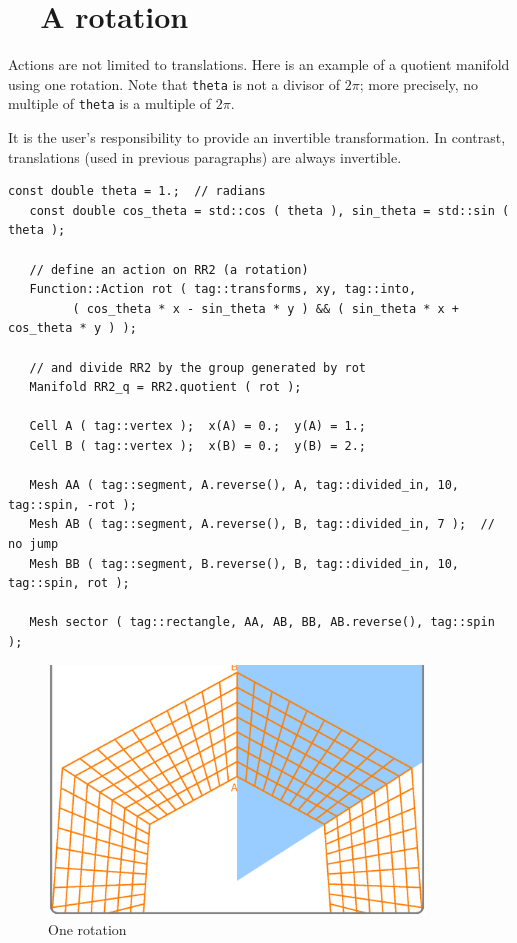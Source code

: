 \section{~~A rotation}\label{\numb section 7.\numb parag 11}

Actions are not limited to translations.
Here is an example of a quotient manifold using one rotation.
Note that {\small\tt theta} is not a divisor of $ 2\pi $;
more precisely, no multiple of {\small\tt theta} is a multiple of $ 2\pi $.

It is the user's responsibility to provide an invertible transformation.
In contrast, translations (used in previous paragraphs) are always invertible.

\begin{Verbatim}[commandchars=\\\{\},formatcom=\small\tt,frame=single,
   label=parag-\ref{\numb section 7.\numb parag 11}.cpp,rulecolor=\color{coment},
   baselinestretch=0.94,framesep=2mm                                             ]
   const double theta = 1.;  // radians
   const double cos_theta = std::cos ( theta ), sin_theta = std::sin ( theta );
	
   // define an action on RR2 (a rotation)
   Function::Action rot ( tag::transforms, xy, tag::into,
         ( cos_theta * x - sin_theta * y ) && ( sin_theta * x + cos_theta * y ) );

   // and divide RR2 by the group generated by rot
   Manifold RR2_q = RR2.quotient ( rot );

   Cell A ( tag::vertex );  x(A) = 0.;  y(A) = 1.;
   Cell B ( tag::vertex );  x(B) = 0.;  y(B) = 2.;

   Mesh AA ( tag::segment, A.reverse(), A, tag::divided_in, 10, tag::spin, -rot );
   Mesh AB ( tag::segment, A.reverse(), B, tag::divided_in, 7 );  // no jump
   Mesh BB ( tag::segment, B.reverse(), B, tag::divided_in, 10, tag::spin, rot );

   Mesh sector ( tag::rectangle, AA, AB, BB, AB.reverse(), tag::spin );
\end{Verbatim}

\begin{figure}[ht] \centering
  \includegraphics[width=100mm]{sector-1.eps}
  \caption{One rotation}
  \label{\numb section 7.\numb fig 7}
\end{figure}

